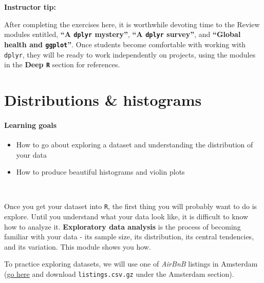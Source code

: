 \documentclass[
]{book}
\providecommand{\tightlist}{%
  \setlength{\itemsep}{0pt}\setlength{\parskip}{0pt}}
\begin{document}
\leavevmode\hypertarget{tip-text}{}%
\textbf{Instructor tip:}

After completing the exercises here, it is worthwhile devoting time to the Review modules entitled, \textbf{``A \texttt{dplyr} mystery''}, \textbf{``A \texttt{dplyr} survey''}, and \textbf{``Global health and \texttt{ggplot}''}. Once students become comfortable with working with \texttt{dplyr}, they will be ready to work independently on projects, using the modules in the \textbf{Deep \texttt{R}} section for references.

\hypertarget{distributions-histograms}{%
\chapter{Distributions \& histograms}\label{distributions-histograms}}

\hypertarget{learning-goals-11}{%
\subsubsection*{Learning goals}\label{learning-goals-11}}

\begin{itemize}
\tightlist
\item
  How to go about exploring a dataset and understanding the distribution of your data\\
\item
  How to produce beautiful histograms and violin plots
\end{itemize}

~

Once you get your dataset into \texttt{R}, the first thing you will probably want to do is explore. Until you understand what your data look like, it is difficult to know how to analyze it. \textbf{Exploratory data analysis} is the process of becoming familiar with your data - its sample size, its distribution, its central tendencies, and its variation. This module shows you how.

To practice exploring datasets, we will use one of \emph{AirBnB} listings in Amsterdam (\href{http://insideairbnb.com/get-the-data.html}{go here} and download \texttt{listings.csv.gz} under the Amsterdam section).
\end{document}
